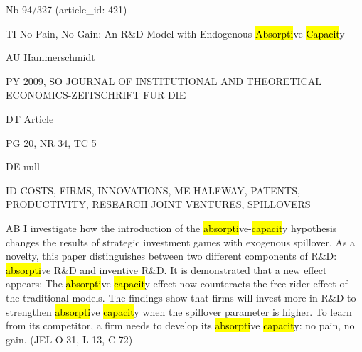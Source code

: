 \documentclass[a4paper]{article}
\begin{document}
\vspace*{-2cm}
Nb \tabto{0cm}94/327 (article\_id: 421)\par
TI \tabto{0cm}No Pain, No Gain: An R\&D Model with Endogenous \hl{Absorpti}ve \hl{Capacit}y\par
AU \tabto{0cm}Hammerschmidt\par
PY \tabto{0cm}2009, SO JOURNAL OF INSTITUTIONAL AND THEORETICAL ECONOMICS-ZEITSCHRIFT FUR DIE\par
DT \tabto{0cm}Article\par
PG \tabto{0cm}20, NR 34, TC 5\par
DE \tabto{0cm}null\par
ID \tabto{0cm}COSTS, FIRMS, INNOVATIONS, ME HALFWAY, PATENTS, PRODUCTIVITY, RESEARCH JOINT VENTURES, SPILLOVERS\par
AB \tabto{0cm}I investigate how the introduction of the \hl{absorpti}ve-\hl{capacit}y hypothesis changes the results of strategic investment games with exogenous spillover. As a novelty, this paper distinguishes between two different components of R\&D: \hl{absorpti}ve R\&D and inventive R\&D. It is demonstrated that a new effect appears: The \hl{absorpti}ve-\hl{capacit}y effect now counteracts the free-rider effect of the traditional models. The findings show that firms will invest more in R\&D to strengthen \hl{absorpti}ve \hl{capacit}y when the spillover parameter is higher. To learn from its competitor, a firm needs to develop its \hl{absorpti}ve \hl{capacit}y: no pain, no gain. (JEL O 31, L 13, C 72)\par
\clearpage
\end{document}
